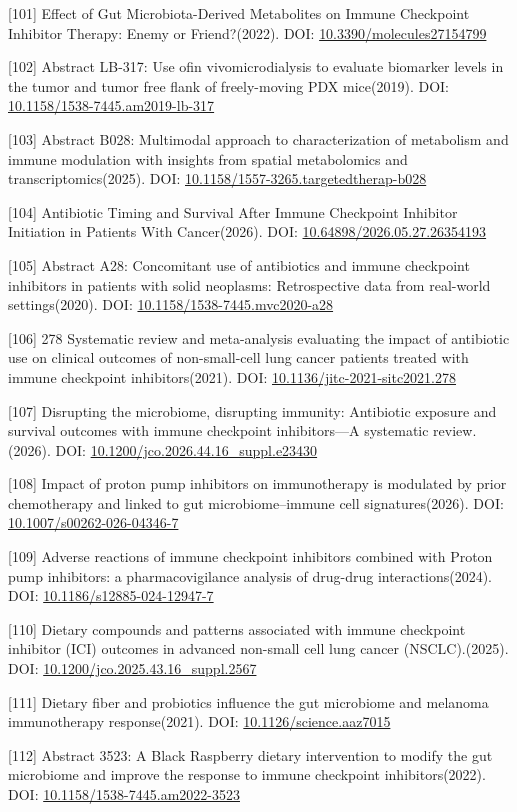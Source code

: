 \documentclass[11pt]{article}
\begin{document}
{[}101{]} Effect of Gut Microbiota-Derived Metabolites on Immune Checkpoint Inhibitor Therapy: Enemy or Friend?(2022). DOI: \url{10.3390/molecules27154799}

{[}102{]} Abstract LB-317: Use ofin vivomicrodialysis to evaluate biomarker levels in the tumor and tumor free flank of freely-moving PDX mice(2019). DOI: \url{10.1158/1538-7445.am2019-lb-317}

{[}103{]} Abstract B028: Multimodal approach to characterization of metabolism and immune modulation with insights from spatial metabolomics and transcriptomics(2025). DOI: \url{10.1158/1557-3265.targetedtherap-b028}

{[}104{]} Antibiotic Timing and Survival After Immune Checkpoint Inhibitor Initiation in Patients With Cancer(2026). DOI: \url{10.64898/2026.05.27.26354193}

{[}105{]} Abstract A28: Concomitant use of antibiotics and immune checkpoint inhibitors in patients with solid neoplasms: Retrospective data from real-world settings(2020). DOI: \url{10.1158/1538-7445.mvc2020-a28}

{[}106{]} 278 Systematic review and meta-analysis evaluating the impact of antibiotic use on clinical outcomes of non-small-cell lung cancer patients treated with immune checkpoint inhibitors(2021). DOI: \url{10.1136/jitc-2021-sitc2021.278}

{[}107{]} Disrupting the microbiome, disrupting immunity: Antibiotic exposure and survival outcomes with immune checkpoint inhibitors---A systematic review.(2026). DOI: \url{10.1200/jco.2026.44.16_suppl.e23430}

{[}108{]} Impact of proton pump inhibitors on immunotherapy is modulated by prior chemotherapy and linked to gut microbiome--immune cell signatures(2026). DOI: \url{10.1007/s00262-026-04346-7}

{[}109{]} Adverse reactions of immune checkpoint inhibitors combined with Proton pump inhibitors: a pharmacovigilance analysis of drug-drug interactions(2024). DOI: \url{10.1186/s12885-024-12947-7}

{[}110{]} Dietary compounds and patterns associated with immune checkpoint inhibitor (ICI) outcomes in advanced non-small cell lung cancer (NSCLC).(2025). DOI: \url{10.1200/jco.2025.43.16_suppl.2567}

{[}111{]} Dietary fiber and probiotics influence the gut microbiome and melanoma immunotherapy response(2021). DOI: \url{10.1126/science.aaz7015}

{[}112{]} Abstract 3523: A Black Raspberry dietary intervention to modify the gut microbiome and improve the response to immune checkpoint inhibitors(2022). DOI: \url{10.1158/1538-7445.am2022-3523}
\end{document}
